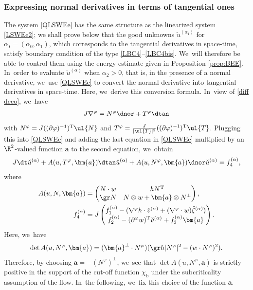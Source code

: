 \subsubsection{Expressing normal derivatives in terms of tangential ones}
The system \eqref{QLSWEe} has the same structure as the linearized system \eqref{LSWEe2};
we shall prove below that the good unknowns $\check{u}^{(\alpha_I)}$ for $\alpha_I=(\alpha_0,\alpha_1)$,
which corresponds to the tangential derivatives in space-time, satisfy boundary condition of the type \eqref{LBC4}--\eqref{LBC4bis}. We~will therefore be able to control them using the energy estimate given in Proposition \ref{prop:BEE}. In~order to evaluate $\check{u}^{(\alpha)}$ when $\alpha_2>0$, that is, in the presence of a normal derivative, we~use \eqref{QLSWEe} to convert the normal derivative into tangential derivatives in space-time.
Here, we~derive this conversion formula. In~view of \eqref{diff deco}, we~have
\begin{equation}\label{diff deco2}
J\nabla^\varphi=N^\varphi\dnor+T^\varphi\dtan
\end{equation}
with $N^\varphi=J((\partial\varphi)^{-1})^\mathrm{T}\ul{N}$ and $T^\varphi=\frac{J}{|\ul{T}|^2}((\partial\varphi)^{-1})^\mathrm{T}\ul{T}$.
Plugging this into \eqref{QLSWEe} and adding the last equation in \eqref{QLSWEe} multiplied by an $\R^2$-valued function $\bm{a}$ to the second equation, we~obtain
\begin{equation}\label{QLSWEe2}
J\dt\check{u}^{(\alpha)}+A(u,T^\varphi,\bm{a})\dtan\check{u}^{(\alpha)}+A(u,N^\varphi,\bm{a})\dnor\check{u}^{(\alpha)}=f_4^{(\alpha)},
\end{equation}
where
\begin{align*}
A(u,N,\bm{a}) &=
\begin{pmatrix}
N\cdot w & hN^\mathrm{T} \\
\gr N & N\otimes w+\bm{a}\otimes N^\perp
\end{pmatrix}, \\
f_4^{(\alpha)} &= J
\begin{pmatrix}
f_1^{(\alpha)} - (\nabla^\varphi h\cdot\check{v}^{(\alpha)} + (\nabla^\varphi\cdot w)\check{\zeta}^{(\alpha)}) \\
f_2^{(\alpha)} - (\partial^\varphi w)^\mathrm{T}\check{v}^{(\alpha)} + f_3^{(\alpha)}\bm{a}
\end{pmatrix}.
\end{align*}
Here, we~have
\[
\det A(u,N^\varphi,\bm{a}) = (\bm{a}^\perp\cdot N^\varphi)(\gr h|N^\varphi|^2-(w\cdot N^\varphi)^2).
\]
Therefore, by choosing $\bm{a}=-(N^\varphi)^\perp$, we~see that $\det A(u,N^\varphi,\bm{a})$ is strictly positive
in the support of the cut-off function $\chi_\mathrm{b}$ under the subcriticality assumption of the flow. In~the following, we~fix this choice of the function $\bm{a}$.

